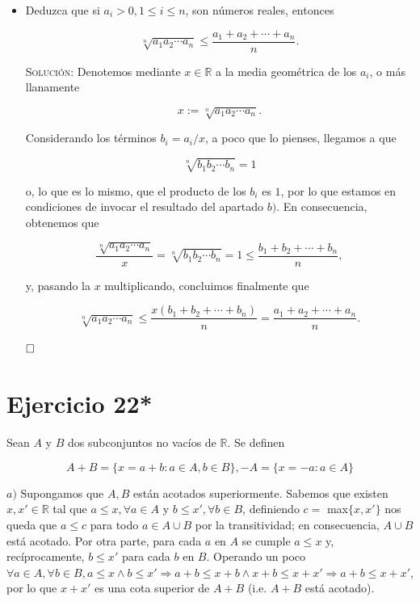 \documentclass{article}
\begin{document}
\begin{itemize}
\begin{itemize}
        \[1 < b_1 + b_{n + 1} - b_1b_{n + 1}.\]

        Los restantes y vagos argumentos se confían al rector. \hfill{\textsc{Q.e.d.}}
    \end{itemize}

    \item[$c)$] Deduzca que si $a_i > 0, 1 \leq i \leq n$, son números reales, entonces
    
    \[\sqrt[n]{a_1a_2\cdots a_n} \leq \frac{a_1 + a_2 + \cdots + a_n}{n}.\]

    \vspace{7px}

    \textsc{Solución}: Denotemos mediante $x \in \mathbb{R}$ a la media geométrica de los $a_i$, o más llanamente

    \[x := \sqrt[n]{a_1a_2\cdots a_n}.\]

    Considerando los términos $b_i = a_i / x$, a poco que lo pienses, llegamos a que

    \[\sqrt[n]{b_1b_2\cdots b_n} = 1\]

    o, lo que es lo mismo, que el producto de los $b_i$ es $1$, por lo que estamos en condiciones de invocar el resultado del apartado $b)$. En consecuencia, obtenemos que

    \[\frac{\sqrt[n]{a_1a_2\cdots a_n}}{x} = \sqrt[n]{b_1b_2\cdots b_n} = 1 \leq \frac{b_1 + b_2 + \cdots + b_n}{n},\]

    y, pasando la $x$ multiplicando, concluimos finalmente que

    \[\sqrt[n]{a_1a_2\cdots a_n} \leq \frac{x(b_1 + b_2 + \cdots + b_n)}{n} = \frac{a_1 + a_2 + \cdots + a_n}{n}.\]

    $\hfill\square$
\end{itemize}

\newpage

\section{Ejercicio 22*}

Sean $A$ y $B$ dos subconjuntos no vacíos de $\mathbb{R}$. Se definen

\[A + B = \{x = a + b : a \in A, b \in B\}, -A = \{x = -a : a \in A\}\]

$a)$ Supongamos que $A, B$ están acotados superiormente. Sabemos que existen $x, x' \in \mathbb{R}$ tal que $a \leq x, \forall a \in A$ y $b \leq x', \forall b \in B$, definiendo $c =$ max$\{x, x'\}$ nos queda que $a \leq c$ para todo $a \in A \cup B$ por la transitividad; en consecuencia, $A \cup B$ está acotado. Por otra parte, para cada $a$ en $A$ se cumple $a \leq x$ y, recíprocamente, $b \leq x'$ para cada $b$ en $B$. Operando un poco $\forall a \in A, \forall b \in B, a \leq x \land b \leq x' \Longrightarrow a + b \leq x + b \land x + b \leq x + x' \Longrightarrow a + b \leq x + x'$, por lo que $x + x'$ es una cota superior de $A + B$ (i.e. $A + B$ está acotado).
\end{document}
